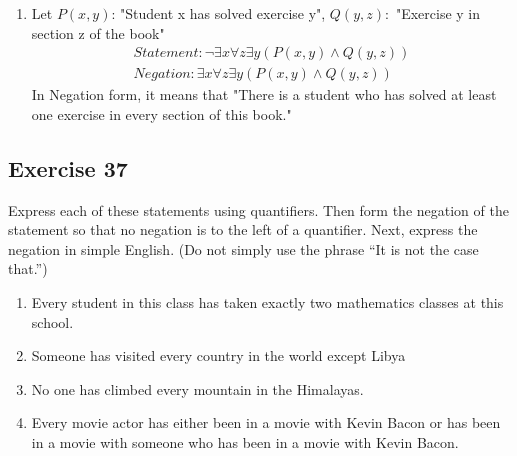 \documentclass{article}
\begin{document}
\begin{enumerate} [label = (\alph*)]
\begin{align}
              Statement: \exists x\forall yP(x, y) \nonumber \\
              Negation : \forall x \exists y \lnot P(x, y) \nonumber
          \end{align}
          In Negation form, it means that "For every student, there are some exercises that has not solved.
    \item Let $P(x, y)$: "Student x has solved exercise y", $Q(y, z):$ "Exercise y in section z of the book"
          \begin{align}
              Statement: \lnot \exists x\forall z\exists y(P(x, y) \land Q(y, z)) \nonumber \\
              Negation: \exists x\forall z\exists y(P(x, y) \land Q(y, z)) \nonumber
          \end{align}
          In Negation form, it means that "There is a student who has solved at least one exercise in every section of this book."
\end{enumerate}
\subsection*{Exercise 37}
Express each of these statements using quantifiers. Then form the negation of the statement so that no negation is to the left of a quantifier. Next, express the negation in simple English. (Do not simply use the phrase “It is not the case that.”)
\begin{enumerate} [label = (\alph*)]
    \item Every student in this class has taken exactly two mathematics classes at this school.
    \item Someone has visited every country in the world except Libya
    \item No one has climbed every mountain in the Himalayas.
    \item Every movie actor has either been in a movie with Kevin Bacon or has been in a movie with someone who has been in a movie with Kevin Bacon.
\end{enumerate}
\end{document}
